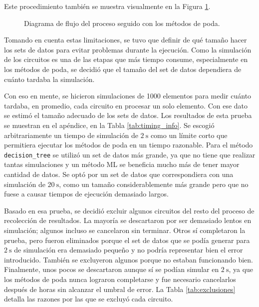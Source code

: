 Este procedimiento también se muestra visualmente en la Figura
\ref{fig:flow_poda}.

\begin{figure}[htb]
  \begin{center}
    
  \end{center}
  \caption{Diagrama de flujo del proceso seguido con los métodos de poda.}
  \label{fig:flow_poda}
\end{figure}

Tomando en cuenta estas limitaciones, se tuvo que definir de qué tamaño hacer
los sets de datos para evitar problemas durante la ejecución. Como la
simulación de los circuitos es una de las etapas que más tiempo consume,
especialmente en los métodos de poda, se decidió que el tamaño del set de datos
dependiera de cuánto tardaba la simulación.

Con eso en mente, se hicieron simulaciones de \num{1000} elementos para medir
cuánto tardaba, en promedio, cada circuito en procesar un solo elemento. Con
ese dato se estimó el tamaño adecuado de los sets de datos. Los resultados de
esta prueba se muestran en el apéndice, en la Tabla \ref{tab:timing_info}. Se
escogió arbitrariamente un tiempo de simulación de $\SI{2}{\second}$ como un
límite corto que permitiera ejecutar los métodos de poda en un tiempo razonable.
Para el método \texttt{decision\_tree} se utilizó un set de datos más grande,
ya que no tiene que realizar tantas simulaciones y un método ML se beneficia
mucho más de tener mayor cantidad de datos. Se optó por un set de datos que
correspondiera con una simulación de $\SI{20}{\second}$, como un tamaño
considerablemente más grande pero que no fuese a causar tiempos de ejecución
demasiado largos.

Basado en esa prueba, se decidió excluir algunos circuitos del resto del
proceso de recolección de resultados. La mayoría se descartaron por ser
demasiado lentos en simulación; algunos incluso se cancelaron sin terminar.
Otros sí completaron la prueba, pero fueron eliminados porque el set de datos
que se podía generar para $\SI{2}{\second}$ de simulación era demasiado pequeño
y no podría representar bien el error introducido. También se excluyeron algunos
porque no estaban funcionando bien. Finalmente, unos pocos se descartaron
aunque sí se podían simular en $\SI{2}{\second}$, ya que los métodos de poda
nunca lograron completarse y fue necesario cancelarlos después de horas sin
alcanzar el umbral de error. La Tabla \ref{tab:exclusiones} detalla las razones
por las que se excluyó cada circuito.


